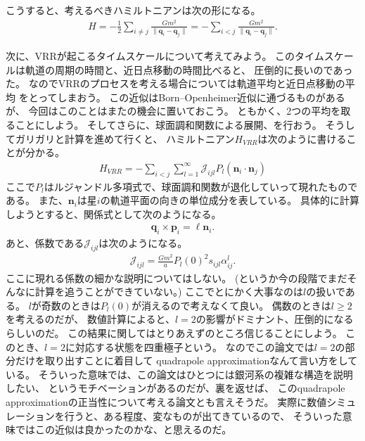 \documentclass[10pt, pre, twocolumn, showpacs, aps]{revtex4-1}
\begin{document}
こうすると、考えるべきハミルトニアンは次の形になる。
\begin{align}
H=-\frac{1}{2}\sum_{i\ne j}\frac{Gm^{2}}{\|\pmb{q}_{i}-\pmb{q}_{j}\|}
=-\sum_{i<j}\frac{Gm^{2}}{\|\pmb{q}_{i}-\pmb{q}_{j}\|}.
\end{align}

次に、VRRが起こるタイムスケールについて考えてみよう。
このタイムスケールは軌道の周期の時間と、近日点移動の時間比べると、
圧倒的に長いのであった。
なのでVRRのプロセスを考える場合については軌道平均と近日点移動の平均
をとってしまおう。
この近似はBorn--Openheimer近似に通づるものがあるが、
今回はこのことはまたの機会に置いておこう。
ともかく、2つの平均を取ることにしよう。
そしてさらに、球面調和関数による展開、を行おう。
そうしてガリガリと計算を進めて行くと、
ハミルトニアン$H_{VRR}$は次のように書けることが分かる。
\begin{align}
H_{VRR}=-\sum_{i<j}\sum_{l=1}^{\infty}\mathcal{J}_{ijl}P_{l}(\pmb{n}_{i}\cdot\pmb{n}_{j})
\end{align}
ここで$P_{l}$はルジャンドル多項式で、球面調和関数が退化していって現れたものである。
また、$\pmb{n}_{i}$は星$i$の軌道平面の向きの単位成分を表している。
具体的に計算しようとすると、関係式として次のようになる。
\begin{align}
\pmb{q}_{i}\times\pmb{p}_{i}=\ell\pmb{n}_{i}.
\end{align}
あと、係数である$\mathcal{J}_{ijl}$は次のようになる。
\begin{align}
\mathcal{J}_{ijl}=\frac{Gm^{2}}{a}P_{l}(0)^{2}s_{ijl}\alpha_{ij}^{l}.
\end{align}
ここに現れる係数の細かな説明についてはしない。
(というか今の段階でまだそんなに計算を追うことができていない。)
ここでとにかく大事なのは$l$の扱いである。
$l$が奇数のときは$P_{l}(0)$が消えるので考えなくて良い。
偶数のときは$l\geq 2$を考えるのだが、
数値計算によると、$l=2$の影響がドミナント、圧倒的になるらしいのだ。
この結果に関してはとりあえずのところ信じることにしよう。
このとき、$l=2$に対応する状態を四重極子という。
なのでこの論文では$l=2$の部分だけを取り出すことに着目して
quadrapole approximationなんて言い方をしている。
そういった意味では、この論文はひとつには銀河系の複雑な構造を説明したい、
というモチベーションがあるのだが、裏を返せば、
このquadrapole approximationの正当性について考える論文とも言えそうだ。
実際に数値シミュレーションを行うと、ある程度、変なものが出てきているので、
そういった意味ではこの近似は良かったのかな、と思えるのだ。
\end{document}
